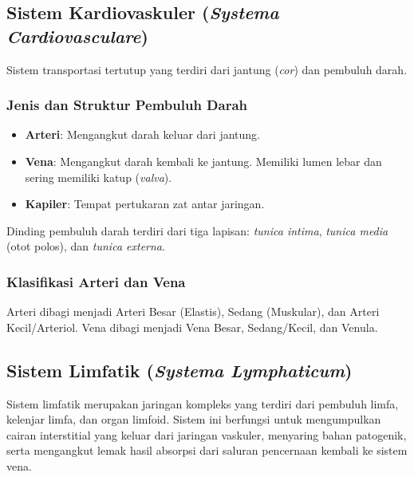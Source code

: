 \subsection[Sistem Kardiovaskuler (Systema Cardiovasculare)]{Sistem Kardiovaskuler (\textit{Systema Cardiovasculare})}
\label{subsec:sistem_kardiovaskuler}

Sistem transportasi tertutup yang terdiri dari jantung (\textit{cor}) dan pembuluh darah.
\subsubsection{Jenis dan Struktur Pembuluh Darah}
\begin{itemize}
    \item \textbf{Arteri}: Mengangkut darah keluar dari jantung.
    \item \textbf{Vena}: Mengangkut darah kembali ke jantung. Memiliki lumen lebar dan sering memiliki katup (\textit{valva}).
    \item \textbf{Kapiler}: Tempat pertukaran zat antar jaringan.
\end{itemize}

Dinding pembuluh darah terdiri dari tiga lapisan: \textit{tunica intima}, \textit{tunica media} (otot polos), dan \textit{tunica externa}.

\subsubsection{Klasifikasi Arteri dan Vena}
Arteri dibagi menjadi Arteri Besar (Elastis), Sedang (Muskular), dan Arteri Kecil/Arteriol. Vena dibagi menjadi Vena Besar, Sedang/Kecil, dan Venula.

\subsection[Sistem Limfatik (Systema Lymphaticum)]{Sistem Limfatik (\textit{Systema Lymphaticum})}
\label{subsec:sistem_limfatik}

Sistem limfatik merupakan jaringan kompleks yang terdiri dari pembuluh limfa, kelenjar limfa, dan organ limfoid. Sistem ini berfungsi untuk mengumpulkan cairan interstitial yang keluar dari jaringan vaskuler, menyaring bahan patogenik, serta mengangkut lemak hasil absorpsi dari saluran pencernaan kembali ke sistem vena.

